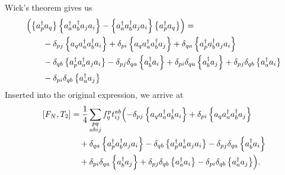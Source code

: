     Wick's theorem gives us
    \begin{align*}
        & \Bigl( \left\{a^\dagger_p a_q\right\} \left\{a^\dagger_a a^\dagger_b a_j a_i\right\}
            - \left\{a^\dagger_a a^\dagger_b a_j a_i\right\} \left\{a^\dagger_p a_q\right\} \Bigr) = \\
        & \qquad - \delta_{pj} \left\{a_q a^\dagger_a a^\dagger_b a_i\right\}
        + \delta_{pi} \left\{a_q a^\dagger_a a^\dagger_b a_j\right\}
        + \delta_{qa} \left\{a^\dagger_p a^\dagger_b a_j a_i\right\} \\
        & \qquad - \delta_{qb}\left\{a^\dagger_p a^\dagger_a a_j a_i\right\} 
        - \delta_{pj} \delta_{qa} \left\{a^\dagger_b a_i\right\}
        + \delta_{pi} \delta_{qa} \left\{a^\dagger_b a_j\right\}
        + \delta_{pj} \delta_{qb} \left\{a^\dagger_a a_i\right\} \\
        & \qquad - \delta_{pi} \delta_{qb} \left\{a^\dagger_a a_j\right\}
    \end{align*}
    Inserted into the original expression, we arrive at
    \begin{align*}
        \left[ F_N, T_2 \right]
        &= \frac{1}{4} \sum_{\substack{pq\\abij}} f_q^p t_{ij}^{ab} \Bigl(
        - \delta_{pj} \left\{a_q a^\dagger_a a^\dagger_b a_i\right\}
        + \delta_{pi} \left\{a_q a^\dagger_a a^\dagger_b a_j\right\} \\
        & \quad + \delta_{qa} \left\{a^\dagger_p a^\dagger_b a_j a_i\right\}
        - \delta_{qb}\left\{a^\dagger_p a^\dagger_a a_j a_i\right\} 
        - \delta_{pj} \delta_{qa} \left\{a^\dagger_b a_i\right\} \\
        & \quad + \delta_{pi} \delta_{qa} \left\{a^\dagger_b a_j\right\}
        + \delta_{pj} \delta_{qb} \left\{a^\dagger_a a_i\right\}
        - \delta_{pi} \delta_{qb} \left\{a^\dagger_a a_j\right\} \Bigr).
    \end{align*}

